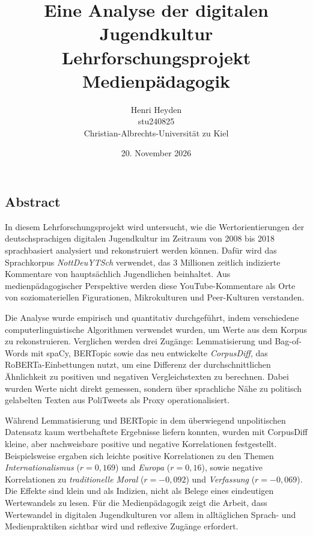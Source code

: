 

\newcommand{\titletext}{Eine Analyse der digitalen Jugendkultur}

\title{\titletext \\ \large Lehrforschungsprojekt Medienpädagogik}
\date{20. November 2026}
\author{Henri Heyden \\%
    \small stu240825 \\%
    \small Christian-Albrechts-Universität zu Kiel%
}



\begin{titlepage}
    \maketitle
    \thispagestyle{empty}

    \section*{Abstract}
    In diesem Lehrforschungsprojekt wird untersucht, wie die Wertorientierungen der deutschsprachigen digitalen Jugendkultur im Zeitraum von 2008 bis 2018 sprachbasiert analysiert und rekonstruiert werden können.
    Dafür wird das Sprachkorpus \emph{NottDeuYTSch} verwendet, das 3 Millionen zeitlich indizierte Kommentare von hauptsächlich Jugendlichen beinhaltet.
    Aus medienpädagogischer Perspektive werden diese YouTube-Kommentare als Orte von soziomateriellen Figurationen, Mikrokulturen und Peer-Kulturen verstanden.

    Die Analyse wurde empirisch und quantitativ durchgeführt, indem verschiedene computerlinguistische Algorithmen verwendet wurden, um Werte aus dem Korpus zu rekonstruieren.
    Verglichen werden drei Zugänge: Lemmatisierung und Bag-of-Words mit spaCy, BERTopic sowie das neu entwickelte \emph{CorpusDiff}, das RoBERTa-Einbettungen nutzt, um eine Differenz der durchschnittlichen Ähnlichkeit zu positiven und negativen Vergleichstexten zu berechnen.
    Dabei wurden Werte nicht direkt gemessen, sondern über sprachliche Nähe zu politisch gelabelten Texten aus PoliTweets als Proxy operationalisiert.

    Während Lemmatisierung und BERTopic in dem überwiegend unpolitischen Datensatz kaum wertbehaftete Ergebnisse liefern konnten, wurden mit CorpusDiff kleine, aber nachweisbare positive und negative Korrelationen festgestellt.
    Beispielsweise ergaben sich leichte positive Korrelationen zu den Themen \emph{Internationalismus} (\(r = 0,169\)) und \emph{Europa} (\(r = 0,16\)), sowie negative Korrelationen zu \emph{traditionelle Moral} (\(r = -0,092\)) und \emph{Verfassung} (\(r = -0,069\)).
    Die Effekte sind klein und als Indizien, nicht als Belege eines eindeutigen Wertewandels zu lesen.
    Für die Medienpädagogik zeigt die Arbeit, dass Wertewandel in digitalen Jugendkulturen vor allem in alltäglichen Sprach- und Medienpraktiken sichtbar wird und reflexive Zugänge erfordert.


\end{titlepage}
